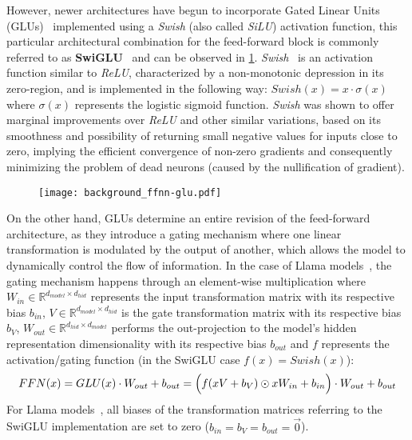 However, newer architectures have begun to incorporate Gated Linear Units (GLUs)~\cite{dauphin2017} implemented using a \emph{Swish} (also called \emph{SiLU}) activation function, this particular architectural combination for the feed-forward block is commonly referred to as \textbf{SwiGLU}~\cite{shazeer2020} and can be observed in \cref{fig:background_ffnn-glu}.
\emph{Swish}~\cite{shazeer2020} is an activation function similar to \emph{ReLU}, characterized by a non-monotonic depression in its zero-region, and is implemented in the following way: $Swish(x) = x \cdot \sigma(x)$ where $\sigma(x)$ represents the logistic sigmoid function.
\emph{Swish} was shown to offer marginal improvements over \emph{ReLU} and other similar variations, based on its smoothness and possibility of returning small negative values for inputs close to zero, implying the efficient convergence of non-zero gradients and consequently minimizing the problem of dead neurons (caused by the nullification of gradient).

\begin{figure}[t!]
    \centering
    \texttt{[image: background\_ffnn-glu.pdf]}
    \caption{}
    \label{fig:background_ffnn-glu}
\end{figure}

On the other hand, GLUs determine an entire revision of the feed-forward architecture, as they introduce a gating mechanism where one linear transformation is modulated by the output of another, which allows the model to dynamically control the flow of information.
In the case of Llama models~\cite{touvron2023,dubey2024}, the gating mechanism happens through an element-wise multiplication where $W_{in} \in \mathbb{R}^{d_{model} \times d_{hid}}$ represents the input transformation matrix with its respective bias $b_{in}$, $V \in \mathbb{R}^{d_{model} \times d_{hid}}$ is the gate transformation matrix with its respective bias $b_{V}$, $W_{out} \in \mathbb{R}^{d_{hid} \times d_{model}}$ performs the out-projection to the model's hidden representation dimensionality with its respective bias $b_{out}$ and $f$ represents the activation/gating function (in the SwiGLU case $f(x) = Swish(x)$):
\begin{equation}
    \label{eq:background_ffnn}
    FFN(x) = GLU(x) \cdot W_{out} + b_{out} 
    = \Bigl( f(xV + b_V) \odot xW_{in} + b_{in} \Bigr) \cdot W_{out} + b_{out}
\end{equation}
For Llama models~\cite{touvron2023,dubey2024}, all biases of the transformation matrices referring to the SwiGLU implementation are set to zero ($b_{in} = b_V = b_{out} = \vec 0$).

